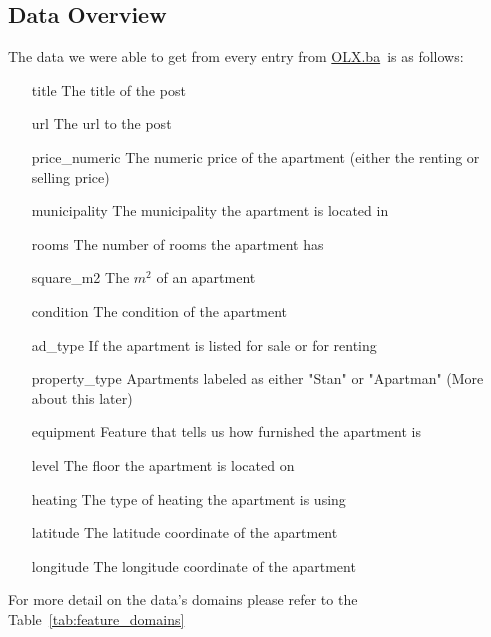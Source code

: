 \documentclass[11pt]{article}
\newcommand{\olx}{\href{https://olx.ba}{OLX.ba}}
\begin{document}
		\pagebreak
		\subsection{Data Overview}
			The data we were able to get from every entry from \olx~is as follows:
			\begin{itemize}
				\item[title] The title of the post
				\item[url] The url to the post
				\item[price\_numeric] The numeric price of the apartment (either the renting or selling price)
				\item[municipality] The municipality the apartment is located in
				\item[rooms] The number of rooms the apartment has
				\item[square\_m2] The $m^2$ of an apartment
				\item[condition] The condition of the apartment
				\item[ad\_type] If the apartment is listed for sale or for renting
				\item[property\_type] Apartments labeled as either "Stan" or "Apartman" (More about this later)
				\item[equipment] Feature that tells us how furnished the apartment is
				\item[level] The floor the apartment is located on
				\item[heating] The type of heating the apartment is using
				\item[latitude] The latitude coordinate of the apartment
				\item[longitude] The longitude coordinate of the apartment
			\end{itemize}

			\vspace{0.5cm}
			\noindent For more detail on the data's domains please refer to the Table~\ref{tab:feature_domains}
\end{document}
